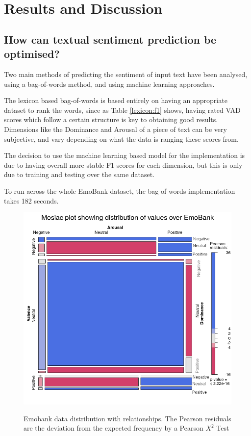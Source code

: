 \section{Results and Discussion} 


\subsection{How can textual sentiment prediction be optimised?}

Two main methods of predicting the sentiment of input text have been analysed, using a bag-of-words method, and using machine learning approaches.

The lexicon based bag-of-words is based entirely on having an appropriate dataset to rank the words, since as Table \ref{lexicon:f1} shows, having rated VAD scores which follow a certain structure is key to obtaining good results. Dimensions like the Dominance and Arousal of a piece of text can be very subjective, and vary depending on what the data is ranging these scores from. 

The decision to use the machine learning based model for the implementation is due to having overall more stable F1 scores for each dimension, but this is only due to training and testing over the same dataset. 

To run across the whole EmoBank dataset, the bag-of-words implementation takes 182 seconds.
    


\begin{figure}[ht]
\caption{Emobank data distribution with relationships. The Pearson residuals are the deviation from the expected frequency by a Pearson $X^2$ Test \cite{pearson1900x}}
\centering
\includegraphics[scale=0.7]{graphs/mosaic_new.png}
\label{mosaic:emo}
\end{figure}

